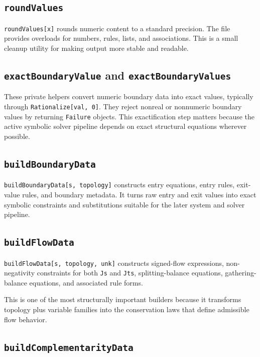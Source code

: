 \documentclass[11pt]{article}
\begin{document}
\subsection*{\texttt{roundValues}}

\texttt{roundValues[x]} rounds numeric content to a standard precision. The file provides overloads for numbers, rules, lists, and associations. This is a small cleanup utility for making output more stable and readable.

\subsection*{\texttt{exactBoundaryValue} and \texttt{exactBoundaryValues}}

These private helpers convert numeric boundary data into exact values, typically through \texttt{Rationalize[val, 0]}. They reject nonreal or nonnumeric boundary values by returning \texttt{Failure} objects. This exactification step matters because the active symbolic solver pipeline depends on exact structural equations wherever possible.

\subsection*{\texttt{buildBoundaryData}}

\texttt{buildBoundaryData[s, topology]} constructs entry equations, entry rules, exit-value rules, and boundary metadata. It turns raw entry and exit values into exact symbolic constraints and substitutions suitable for the later system and solver pipeline.

\subsection*{\texttt{buildFlowData}}

\texttt{buildFlowData[s, topology, unk]} constructs signed-flow expressions, non-negativity constraints for both \texttt{Js} and \texttt{Jts}, splitting-balance equations, gathering-balance equations, and associated rule forms.

This is one of the most structurally important builders because it transforms topology plus variable families into the conservation laws that define admissible flow behavior.

\subsection*{\texttt{buildComplementarityData}}
\end{document}
